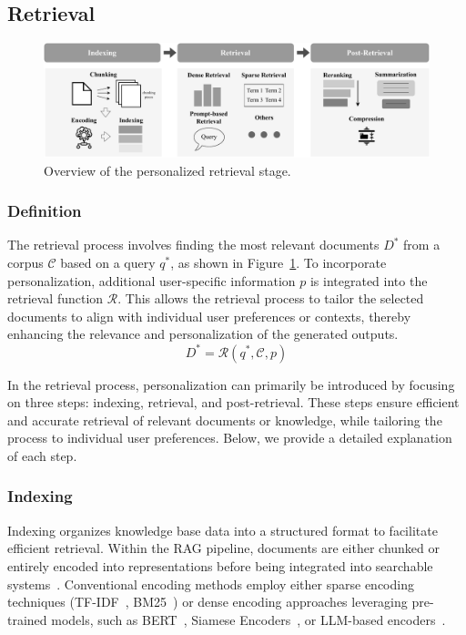 \subsection{Retrieval} \label{sec:Retrieval}
\begin{figure}[t]
    \centering
    \includegraphics[width=\linewidth]{figures/retrieval.pdf}
    \caption{Overview of the personalized retrieval stage.}
    \label{fig:retrieval}
\end{figure}
\subsubsection{\textbf{Definition}}

The retrieval process involves finding the most relevant documents $D^*$ from a corpus $\mathcal{C}$ based on a query $q^*$, as shown in Figure~\ref{fig:retrieval}. To incorporate personalization, additional user-specific information $p$ is integrated into the retrieval function  $\mathcal{R}$. This allows the retrieval process to tailor the selected documents to align with individual user preferences or contexts, thereby enhancing the relevance and personalization of the generated outputs.
\begin{equation}
D^* =  \mathcal{R}\left(q^*,\mathcal{C},p\right)
\end{equation}

In the retrieval process, personalization can primarily be introduced by focusing on three steps: indexing, retrieval, and post-retrieval. These steps ensure efficient and accurate retrieval of relevant documents or knowledge, while tailoring the process to individual user preferences. Below, we provide a detailed explanation of each step.

\subsubsection{\textbf{Indexing}}
Indexing organizes knowledge base data into a structured format to facilitate efficient retrieval. Within the RAG pipeline, documents are either chunked or entirely encoded into representations before being integrated into searchable systems~\cite{douze2024faiss, annoy}. Conventional encoding methods employ either sparse encoding techniques (\eg TF-IDF~\cite{rajaraman2011mining}, BM25~\cite{robertson2009probabilistic}) or dense encoding approaches leveraging pre-trained models, such as BERT~\cite{koroteev2021bert}, Siamese Encoders~\cite{reimers2019sentence}, or LLM-based encoders~\cite{li2023towards, xiao2024c}.

